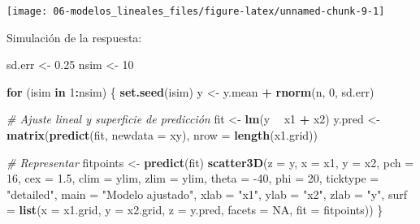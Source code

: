 \documentclass[
]{book}
\newenvironment{Shaded}{\begin{snugshade}}{\end{snugshade}}
\newcommand{\CommentTok}[1]{\textcolor[rgb]{0.56,0.35,0.01}{\textit{#1}}}
\newcommand{\ControlFlowTok}[1]{\textcolor[rgb]{0.13,0.29,0.53}{\textbf{#1}}}
\newcommand{\DataTypeTok}[1]{\textcolor[rgb]{0.13,0.29,0.53}{#1}}
\newcommand{\DecValTok}[1]{\textcolor[rgb]{0.00,0.00,0.81}{#1}}
\newcommand{\FloatTok}[1]{\textcolor[rgb]{0.00,0.00,0.81}{#1}}
\newcommand{\KeywordTok}[1]{\textcolor[rgb]{0.13,0.29,0.53}{\textbf{#1}}}
\newcommand{\NormalTok}[1]{#1}
\newcommand{\OperatorTok}[1]{\textcolor[rgb]{0.81,0.36,0.00}{\textbf{#1}}}
\newcommand{\OtherTok}[1]{\textcolor[rgb]{0.56,0.35,0.01}{#1}}
\newcommand{\StringTok}[1]{\textcolor[rgb]{0.31,0.60,0.02}{#1}}
\theoremstyle{break}
\theoremstyle{definition}
\theoremstyle{definition}
\theoremstyle{definition}
\theoremstyle{remark}
\begin{document}
\begin{center}\texttt{[image: 06-modelos\_lineales\_files/figure-latex/unnamed-chunk-9-1]} \end{center}

Simulación de la respuesta:

\begin{Shaded}
\begin{Highlighting}[]
\NormalTok{sd.err <-}\StringTok{ }\FloatTok{0.25}
\NormalTok{nsim <-}\StringTok{ }\DecValTok{10}

\ControlFlowTok{for}\NormalTok{ (isim }\ControlFlowTok{in} \DecValTok{1}\OperatorTok{:}\NormalTok{nsim) \{}
  \KeywordTok{set.seed}\NormalTok{(isim)}
\NormalTok{  y <-}\StringTok{ }\NormalTok{y.mean }\OperatorTok{+}\StringTok{ }\KeywordTok{rnorm}\NormalTok{(n, }\DecValTok{0}\NormalTok{, sd.err)}
  
  \CommentTok{# Ajuste lineal y superficie de predicción}
\NormalTok{  fit <-}\StringTok{ }\KeywordTok{lm}\NormalTok{(y }\OperatorTok{~}\StringTok{ }\NormalTok{x1 }\OperatorTok{+}\StringTok{ }\NormalTok{x2)}
\NormalTok{  y.pred <-}\StringTok{ }\KeywordTok{matrix}\NormalTok{(}\KeywordTok{predict}\NormalTok{(fit, }\DataTypeTok{newdata =}\NormalTok{ xy), }\DataTypeTok{nrow =} \KeywordTok{length}\NormalTok{(x1.grid)) }
  
  \CommentTok{# Representar}
\NormalTok{  fitpoints <-}\StringTok{ }\KeywordTok{predict}\NormalTok{(fit) }
  \KeywordTok{scatter3D}\NormalTok{(}\DataTypeTok{z =}\NormalTok{ y, }\DataTypeTok{x =}\NormalTok{ x1, }\DataTypeTok{y =}\NormalTok{ x2, }\DataTypeTok{pch =} \DecValTok{16}\NormalTok{, }\DataTypeTok{cex =} \FloatTok{1.5}\NormalTok{, }\DataTypeTok{clim =}\NormalTok{ ylim, }\DataTypeTok{zlim =}\NormalTok{ ylim,}
            \DataTypeTok{theta =} \DecValTok{-40}\NormalTok{, }\DataTypeTok{phi =} \DecValTok{20}\NormalTok{, }\DataTypeTok{ticktype =} \StringTok{"detailed"}\NormalTok{, }
            \DataTypeTok{main =} \StringTok{"Modelo ajustado"}\NormalTok{, }\DataTypeTok{xlab =} \StringTok{"x1"}\NormalTok{, }\DataTypeTok{ylab =} \StringTok{"x2"}\NormalTok{, }\DataTypeTok{zlab =} \StringTok{"y"}\NormalTok{, }
            \DataTypeTok{surf =} \KeywordTok{list}\NormalTok{(}\DataTypeTok{x =}\NormalTok{ x1.grid, }\DataTypeTok{y =}\NormalTok{ x2.grid, }\DataTypeTok{z =}\NormalTok{ y.pred, }
                        \DataTypeTok{facets =} \OtherTok{NA}\NormalTok{, }\DataTypeTok{fit =}\NormalTok{ fitpoints))}
\NormalTok{\}}
\end{Highlighting}
\end{Shaded}
\end{document}
